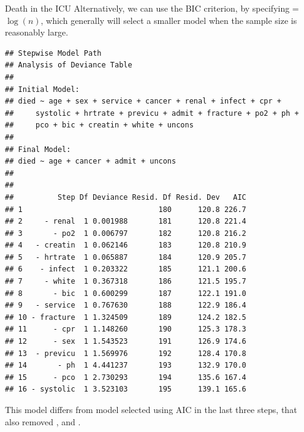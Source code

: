 \documentclass[11pt]{book}
\renewenvironment{knitrout}{\small\renewcommand{\baselinestretch}{.85}}{} %
\begin{document}
\begin{Example}[icu1]{Death in the ICU}
Alternatively, we can use the BIC criterion, by specifying =$\log(n)$,
which generally will select a smaller model when the sample size is reasonably
large.
\begin{knitrout}
\color{fgcolor}\begin{kframe}
\begin{alltt}
 \hlkwb{<-}   \hlstd{=} \hlstd{,} \hlstd{=}\hlstd{(}\hlstd{))}
\hlopt{$}
\end{alltt}
\begin{verbatim}
## Stepwise Model Path 
## Analysis of Deviance Table
## 
## Initial Model:
## died ~ age + sex + service + cancer + renal + infect + cpr + 
##     systolic + hrtrate + previcu + admit + fracture + po2 + ph + 
##     pco + bic + creatin + white + uncons
## 
## Final Model:
## died ~ age + cancer + admit + uncons
## 
## 
##          Step Df Deviance Resid. Df Resid. Dev   AIC
## 1                               180      120.8 226.7
## 2     - renal  1 0.001988       181      120.8 221.4
## 3       - po2  1 0.006797       182      120.8 216.2
## 4   - creatin  1 0.062146       183      120.8 210.9
## 5   - hrtrate  1 0.065887       184      120.9 205.7
## 6    - infect  1 0.203322       185      121.1 200.6
## 7     - white  1 0.367318       186      121.5 195.7
## 8       - bic  1 0.600299       187      122.1 191.0
## 9   - service  1 0.767630       188      122.9 186.4
## 10 - fracture  1 1.324509       189      124.2 182.5
## 11      - cpr  1 1.148260       190      125.3 178.3
## 12      - sex  1 1.543523       191      126.9 174.6
## 13  - previcu  1 1.569976       192      128.4 170.8
## 14       - ph  1 4.441237       193      132.9 170.0
## 15      - pco  1 2.730293       194      135.6 167.4
## 16 - systolic  1 3.523103       195      139.1 165.6
\end{verbatim}
\end{kframe}
\end{knitrout}
This model differs from model  selected using AIC in the last
three steps, that also removed ,  and .
\begin{knitrout}
\color{fgcolor}\begin{kframe}
\begin{alltt}
\end{alltt}

\end{kframe}
\end{knitrout}
\end{Example}
\end{document}
